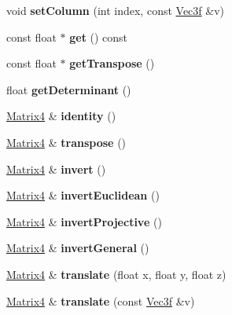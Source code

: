 \begin{DoxyCompactItemize}
void {\bfseries set\+Column} (int index, const \hyperlink{struct_vec3f}{Vec3f} \&v)
\item 
\mbox{\label{class_matrix4_a31c109fc6162eb7c5901a8b2a7db14ad}} 
const float $\ast$ {\bfseries get} () const
\item 
\mbox{\label{class_matrix4_a9914294a87c0974ca6811c43a5127668}} 
const float $\ast$ {\bfseries get\+Transpose} ()
\item 
\mbox{\label{class_matrix4_aa4364553435acdea523deae68dc3c27f}} 
float {\bfseries get\+Determinant} ()
\item 
\mbox{\label{class_matrix4_a6579c04e6c37890a0f109450457b7d5d}} 
\hyperlink{class_matrix4}{Matrix4} \& {\bfseries identity} ()
\item 
\mbox{\label{class_matrix4_a71e0b29252a6e3c78e396342ac459e40}} 
\hyperlink{class_matrix4}{Matrix4} \& {\bfseries transpose} ()
\item 
\mbox{\label{class_matrix4_a47f0c18f047af011ae6f20203d4c67f1}} 
\hyperlink{class_matrix4}{Matrix4} \& {\bfseries invert} ()
\item 
\mbox{\label{class_matrix4_a9526c76f1d5872a42f46f7ab14a7b68b}} 
\hyperlink{class_matrix4}{Matrix4} \& {\bfseries invert\+Euclidean} ()
\item 
\mbox{\label{class_matrix4_a35ce605b965e642413df0ec9f214e8ef}} 
\hyperlink{class_matrix4}{Matrix4} \& {\bfseries invert\+Projective} ()
\item 
\mbox{\label{class_matrix4_aac71771a4781a04d54091acf710edb55}} 
\hyperlink{class_matrix4}{Matrix4} \& {\bfseries invert\+General} ()
\item 
\mbox{\label{class_matrix4_ab1c73ac475b67cdf8e6cdc579b0a1bbb}} 
\hyperlink{class_matrix4}{Matrix4} \& {\bfseries translate} (float x, float y, float z)
\item 
\mbox{\label{class_matrix4_a921da95960136c2a3d35268c439612d8}} 
\hyperlink{class_matrix4}{Matrix4} \& {\bfseries translate} (const \hyperlink{struct_vec3f}{Vec3f} \&v)

\end{DoxyCompactItemize}
